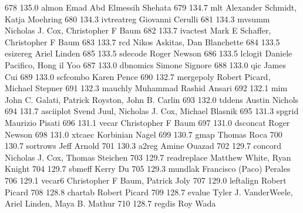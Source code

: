    678    135.0    almon         Emad Abd Elmessih Shehata               
   679    134.7    mlt           Alexander Schmidt, Katja Moehring       
   680    134.3    ivtreatreg    Giovanni Cerulli                        
   681    134.3    mvsumm        Nicholas J. Cox, Christopher F Baum     
   682    133.7    ivactest      Mark E Schaffer, Christopher F Baum     
   683    133.7    rcd           Nikos Askitas, Dan Blanchette           
   684    133.5    esizereg      Ariel Linden                            
   685    133.5    sdecode       Roger Newson                            
   686    133.5    lclogit       Daniele Pacifico, Hong il Yoo           
   687    133.0    dbnomics      Simone Signore                          
   688    133.0    qic           James Cui                               
   689    133.0    scfcombo      Karen Pence                             
   690    132.7    mergepoly     Robert Picard, Michael Stepner          
   691    132.3    mauchly       Muhammad Rashid Ansari                  
   692    132.1    mim           John C. Galati, Patrick Royston, John   
                                   B. Carlin                               
   693    132.0    tddens        Austin Nichols                          
   694    131.7    asciiplot     Svend Juul, Nicholas J. Cox, Michael    
                                   Blasnik                                 
   695    131.3    spgrid        Maurizio Pisati                         
   696    131.1    vecar         Christopher F Baum                      
   697    131.0    dsconcat      Roger Newson                            
   698    131.0    xtcaec        Korbinian Nagel                         
   699    130.7    gmap          Thomas Roca                             
   700    130.7    sortrows      Jeff Arnold                             
   701    130.3    a2reg         Amine Ouazad                            
   702    129.7    concord       Nicholas J. Cox, Thomas Steichen        
   703    129.7    readreplace   Matthew White, Ryan Knight              
   704    129.7    sbmeff        Kerry Du                                
   705    129.3    mundlak       Francisco (Paco) Perales                
   706    129.1    vecar6        Christopher F Baum, Patrick Joly        
   707    129.0    leftalign     Robert Picard                           
   708    128.8    chartab       Robert Picard                           
   709    128.7    evalue        Tyler J. VanderWeele, Ariel Linden,     
                                   Maya B. Mathur                          
   710    128.7    regdis        Roy Wada                                
